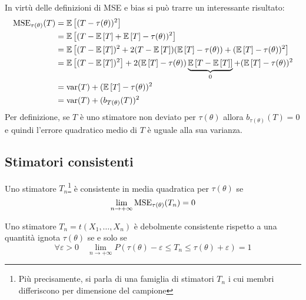 In virtù delle definizioni di MSE e bias si può trarre un interessante risultato:
\begin{align*}
	\operatorname{MSE}_{\tau(\theta)}(T) & = \mathbb{E}\left[ (T-\tau(\theta))^2 \right]                                                                            \\
	                       & = \mathbb{E}\left[ (T-\mathbb{E}\left[ T \right]+\mathbb{E}\left[ T \right]-\tau(\theta))^2 \right]                                                              \\
	                       & = \mathbb{E}\left[ (T-\mathbb{E}\left[ T \right])^2+2(T-\mathbb{E}\left[ T \right])(\mathbb{E}\left[ T \right]-\tau(\theta))+(\mathbb{E}\left[ T \right]-\tau(\theta))^2 \right]                         \\
	                       & = \mathbb{E}\left[ (T-\mathbb{E}\left[ T \right])^2 \right] + 2(\mathbb{E}\left[ T \right]-\tau(\theta))\underbrace{\mathbb{E}\left[ T-\mathbb{E}\left[ T \right] \right]}_{0} + (\mathbb{E}\left[ T \right]-\tau(\theta))^2 \\
	                       & = \operatorname{var}(T) + (\mathbb{E}\left[ T \right]-\tau(\theta))^2                                                                  \\
	                       & = \operatorname{var}(T) + (b_{T(\theta)}(T))^2
\end{align*}
Per definizione, se $T$ è uno stimatore non deviato per $\tau(\theta)$ allora $b_{\tau(\theta)}(T)=0$ e quindi l'errore quadratico medio di $T$ è uguale alla sua varianza.


\subsection{Stimatori consistenti}
\begin{defin}
	Uno stimatore $T_n$\footnote{Più precisamente, si parla di una famiglia di stimatori $T_n$ i cui membri differiscono per dimensione del campione} è consistente in media quadratica per $\tau(\theta)$ se
	\begin{equation*}
		\lim_{n\to+\infty} \operatorname{MSE}_{\tau(\theta)}(T_n) = 0
	\end{equation*}
\end{defin}

\begin{defin}
	Uno stimatore $T_n=t(X_1,\dots,X_n)$ è debolmente consistente rispetto a una quantità ignota $\tau(\theta)$ se e solo se
	\begin{equation*}
		\forall\varepsilon>0 \quad \lim_{n\to+\infty} P(\tau(\theta)-\varepsilon \leq T_n \leq \tau(\theta)+\varepsilon) = 1
	\end{equation*}
\end{defin}

